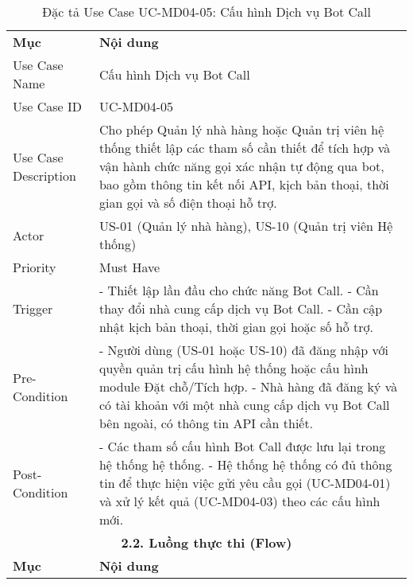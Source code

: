 \begin{longtable}{|m{4cm}|p{11cm}|}
\caption{Đặc tả Use Case UC-MD04-05: Cấu hình Dịch vụ Bot Call} \label{tab:uc_md04_05} \\
\hline

\endhead %
\hline
\endfoot %
\hline
\endlastfoot %
\multicolumn{2}{|c|}{\textbf{2.1. Tóm tắt (Summary)}} \\
\hline
\textbf{Mục} & \textbf{Nội dung} \\
\hline
Use Case Name & Cấu hình Dịch vụ Bot Call \\
\hline
Use Case ID & UC-MD04-05 \\
\hline
Use Case Description & Cho phép Quản lý nhà hàng hoặc Quản trị viên hệ thống thiết lập các tham số cần thiết để tích hợp và vận hành chức năng gọi xác nhận tự động qua bot, bao gồm thông tin kết nối API, kịch bản thoại, thời gian gọi và số điện thoại hỗ trợ. \\
\hline
Actor & US-01 (Quản lý nhà hàng), US-10 (Quản trị viên Hệ thống) \\
\hline
Priority & Must Have \\
\hline
Trigger & - Thiết lập lần đầu cho chức năng Bot Call. \newline - Cần thay đổi nhà cung cấp dịch vụ Bot Call. \newline - Cần cập nhật kịch bản thoại, thời gian gọi hoặc số hỗ trợ. \\
\hline
Pre-Condition & - Người dùng (US-01 hoặc US-10) đã đăng nhập với quyền quản trị cấu hình hệ thống hoặc cấu hình module Đặt chỗ/Tích hợp. \newline - Nhà hàng đã đăng ký và có tài khoản với một nhà cung cấp dịch vụ Bot Call bên ngoài, có thông tin API cần thiết. \\
\hline
Post-Condition & - Các tham số cấu hình Bot Call được lưu lại trong hệ thống hệ thống. \newline - Hệ thống hệ thống có đủ thông tin để thực hiện việc gửi yêu cầu gọi (UC-MD04-01) và xử lý kết quả (UC-MD04-03) theo các cấu hình mới. \\
\hline
\multicolumn{2}{|c|}{\textbf{2.2. Luồng thực thi (Flow)}} \\
\hline
\textbf{Mục} & \textbf{Nội dung} \\
\hline

\end{longtable}

